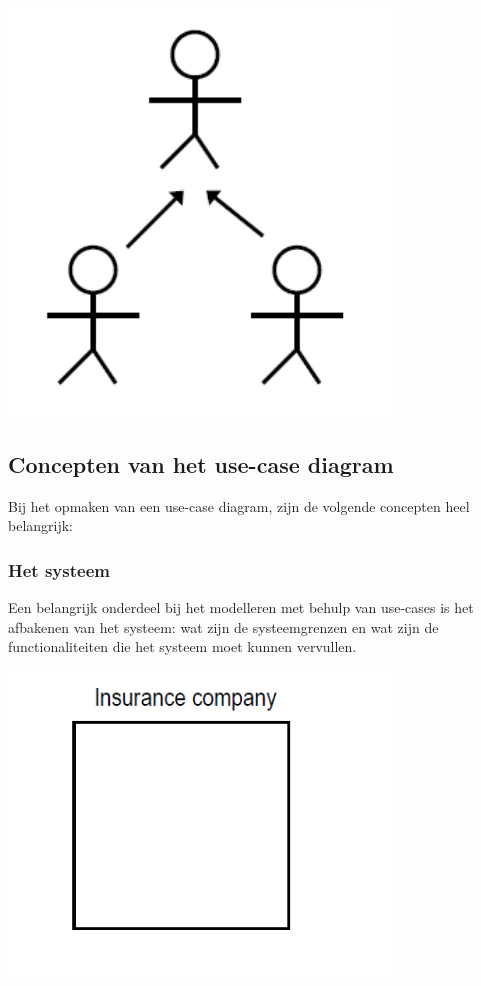
\begin{center}
\includegraphics[width=4in]{img/genact}%
\end{center}

\subsection{Concepten van het use-case diagram}

Bij het opmaken van een use-case diagram, zijn de volgende concepten heel belangrijk:

\subsubsection{Het systeem}

Een belangrijk onderdeel bij het modelleren met behulp van use-cases is het afbakenen van het systeem: wat zijn de systeemgrenzen en wat zijn de functionaliteiten die het systeem moet kunnen vervullen.


\begin{center}
\includegraphics[width=4in]{img/scope}%
\end{center}


